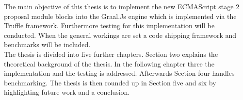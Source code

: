 The main objective of this thesis is to implement the new ECMAScript stage 2 proposal module blocks into the Graal.Js engine which is implemented via the Truffle framework. Furthermore testing for this implementation will be conducted. When the general workings are set a code shipping framework and benchmarks will be included.\\
The thesis is divided into five further chapters. Section two explains the theoretical background of the thesis. In the following chapter three the implementation and the testing is addressed. Afterwards Section four handles benchmarking. The thesis is then rounded up in Section five and six by highlighting future work and a conclusion.



